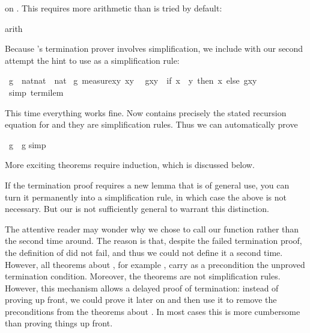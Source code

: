\begin{isabellebody}
\begin{isamarkuptxt}
on . This requires more arithmetic than is tried by default:%
\end{isamarkuptxt}%
arith{\isacharparenright}%
\begin{isamarkuptext}%
\noindent
Because 's termination prover involves simplification,
we include with our second attempt the hint to use  as
a simplification rule:%
\end{isamarkuptext}%
\ g\ {\isacharcolon}{\isacharcolon}\ {\isachardoublequote}nat{\isasymtimes}nat\ {\isasymRightarrow}\ nat{\isachardoublequote}\isanewline
{}\ g\ {\isachardoublequote}measure{\isacharparenleft}{\isasymlambda}{\isacharparenleft}x{\isacharcomma}y{\isacharparenright}{\isachardot}\ x{\isacharminus}y{\isacharparenright}{\isachardoublequote}\isanewline
\ \ {\isachardoublequote}g{\isacharparenleft}x{\isacharcomma}y{\isacharparenright}\ {\isacharequal}\ {\isacharparenleft}if\ x\ {\isasymle}\ y\ then\ x\ else\ g{\isacharparenleft}x{\isacharcomma}y{\isacharplus}\isanewline
{\isacharparenleft}\ simp{\isacharcolon}\ termi{\isacharunderscore}lem{\isacharparenright}%
\begin{isamarkuptext}%
\noindent
This time everything works fine. Now  contains precisely
the stated recursion equation for  and they are simplification
rules. Thus we can automatically prove%
\end{isamarkuptext}%
\ {\isachardoublequote}g{\isacharparenleft}\ {\isacharequal}\ g{\isacharparenleft}\isanewline
{}simp{\isacharparenright}%
\begin{isamarkuptext}%
\noindent
More exciting theorems require induction, which is discussed below.

If the termination proof requires a new lemma that is of general use, you can
turn it permanently into a simplification rule, in which case the above
 is not necessary. But our  is not
sufficiently general to warrant this distinction.

The attentive reader may wonder why we chose to call our function 
rather than  the second time around. The reason is that, despite
the failed termination proof, the definition of  did not
fail, and thus we could not define it a second time. However, all theorems
about , for example , carry as a precondition
the unproved termination condition. Moreover, the theorems
 are not simplification rules. However, this mechanism
allows a delayed proof of termination: instead of proving
 up front, we could prove 
it later on and then use it to remove the preconditions from the theorems
about . In most cases this is more cumbersome than proving things
up front.


\end{isamarkuptext}
\end{isabellebody}
